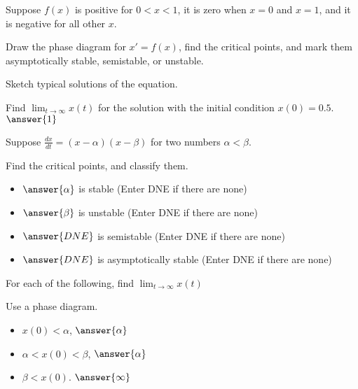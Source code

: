 \documentclass{ximera}
\begin{document}


\begin{exercise}
    Suppose $f(x)$ is positive for $0 < x < 1$, it is zero when $x=0$ and $x=1$, and it is negative for all other $x$.
    \begin{hint}
        Draw the phase diagram for $x' = f(x)$, find the critical points, and mark them asymptotically stable, semistable, or unstable.
    \end{hint}
    \begin{hint}
        Sketch typical solutions of the equation.
    \end{hint}
        
    Find $\displaystyle \lim_{t\to \infty} x(t)$ for the solution with the initial condition $x(0) = 0.5$. $\answer{1}$
\end{exercise}

\begin{exercise}
    Suppose $\frac{dx}{dt} = (x-\alpha)(x-\beta)$ for two numbers $\alpha < \beta$.
    
    Find the critical points, and classify them.
    \begin{itemize}
        \item $\answer{\alpha}$ is stable (Enter DNE if there are none)
        \item $\answer{\beta}$ is unstable (Enter DNE if there are none)
        \item $\answer{DNE}$ is semistable (Enter DNE if there are none)
        \item $\answer{DNE}$ is asymptotically stable (Enter DNE if there are none)
    \end{itemize}
    \begin{problem}
        For each of the following, find $\displaystyle \lim_{t\to\infty} x(t)$ 
        \begin{hint}
            Use a phase diagram.
        \end{hint}
        \begin{itemize}
            \item $x(0) < \alpha$, $\answer{\alpha}$
            \item $\alpha < x(0) < \beta$, $\answer{\alpha}$
            \item $\beta < x(0)$. $\answer{\infty}$
        \end{itemize}
    \end{problem}
\end{exercise}
\end{document}

